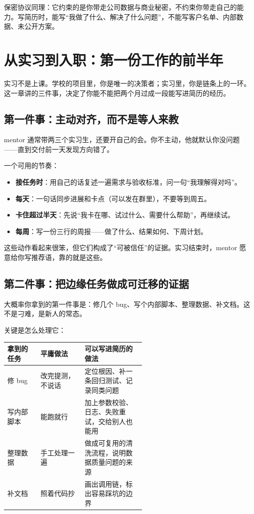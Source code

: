 \documentclass[UTF8,zihao=5,openany]{ctexbook}
\begin{document}
保密协议同理：它约束的是你带走公司数据与商业秘密，不约束你带走自己的能力。写简历时，能写“我做了什么、解决了什么问题”，不能写客户名单、内部数据、未公开方案。


\clearpage\chapter{从实习到入职：第一份工作的前半年}
实习不是上课。学校的项目里，你是唯一的决策者；实习里，你是链条上的一环。这一章讲的三件事，决定了你能不能把两个月过成一段能写进简历的经历。

\section{第一件事：主动对齐，而不是等人来教}
mentor 通常带两三个实习生，还要开自己的会。你不主动，他就默认你没问题——直到交付前一天发现方向错了。

一个可用的节奏：

\begin{itemize}
\item \textbf{接任务时}：用自己的话复述一遍需求与验收标准，问一句“我理解得对吗”。
\item \textbf{每天}：一句话同步进展和卡点（可以发在群里），不要等到周五。
\item \textbf{卡住超过半天}：先说“我卡在哪、试过什么、需要什么帮助”，再继续试。
\item \textbf{每周}：写一份三行的周报——做了什么、结果如何、下周计划。
\end{itemize}

这些动作看起来很笨，但它们构成了“可被信任”的证据。实习结束时，mentor 愿意给你写推荐语，靠的就是这些。

\section{第二件事：把边缘任务做成可迁移的证据}
大概率你拿到的第一件事是：修几个 bug、写个内部脚本、整理数据、补文档。这不是刁难，是新人的常态。

关键是怎么处理它：

\begin{center}\small
\begin{tabularx}{\linewidth}{p{0.24\linewidth}p{0.32\linewidth}Y}
\toprule
拿到的任务 & 平庸做法 & 可以写进简历的做法 \\
\midrule
修 bug & 改完提测，不说话 & 定位根因、补一条回归测试、记录同类问题 \\
写内部脚本 & 能跑就行 & 加上参数校验、日志、失败重试，交给别人也能用 \\
整理数据 & 手工处理一遍 & 做成可复用的清洗流程，说明数据质量问题的来源 \\
补文档 & 照着代码抄 & 画出调用链，标出容易踩坑的边界 \\
\bottomrule
\end{tabularx}
\end{center}
\end{document}
